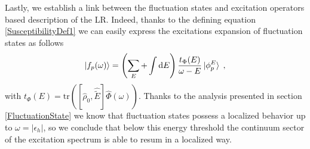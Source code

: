 \documentclass[reprint,aps,prb]{revtex4-1}
\newcommand{\dd}{{\rm d}}
\newcommand{\eps}{\epsilon}
\newcommand{\be}{\begin{equation}}
\newcommand{\ee}{\end{equation}}
\newcommand{\nn}{\notag}
\newcommand{\lb}{\label}
\newcommand{\op}[1]{\hat {#1}}
\newcommand{\commutator}[2]{\left[ {#1} , {#2} \right]}
\newcommand{\trace}[1]{\mathrm{tr}\left(#1\right)}
\newcommand{\dmnot}{\op{\rho}_0}
\begin{document}
Lastly, we establish a link between the fluctuation states and excitation operators based description of the LR. Indeed, thanks to the defining equation \eqref{SusceptibilityDef1} we can 
easily express the excitations expansion of fluctuation states as follows 
\be\lb{FluctuationStateExcitationDef1}
\ket{f_p(\omega)}   =
\left(\sum_E + \int\dd E   \right) 
\frac{t_\Phi(E)}{\omega-E} \ket{\phi^E_p} \;,
\ee 
with $t_\Phi(E)=\trace{\commutator{\dmnot}{\op{\tilde E}}\op\Phi(\omega)}$. 
Thanks to the analysis presented in section \ref{FluctuationState} we know that fluctuation states possess a localized behavior up to $\omega=|\eps_h|$, so we conclude that 
below this energy threshold the continuum sector of the excitation spectrum is able to resum in a localized way.  





\end{document}

